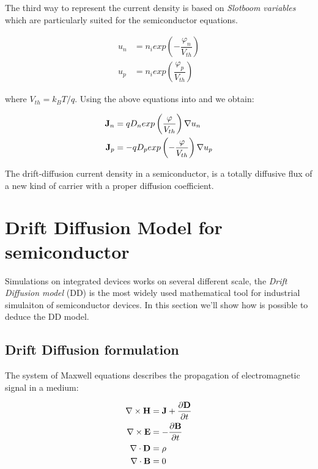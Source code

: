 The third way to represent the current density is based on \textit{Slotboom variables} which are particularly suited for the semiconductor equations.

\begin{align}
u_n &= n_iexp\left(-\dfrac{\varphi_n}{V_{th}} \right) \label{eq: un slotboom} \\
u_p &= n_iexp\left(\dfrac{\varphi_p}{V_{th}} \right) \label{eq: up slotboom} 
\end{align}

where $V_{th}=k_BT/q$. Using the above equations into  and  we obtain:

\begin{align}
\mathbf{J}_n &= qD_n exp\left(\dfrac{\varphi}{V_{th}}\right) \nabla u_n \label{eq: Jn slotboom} \\
\mathbf{J}_p &= -qD_p exp\left(-\dfrac{\varphi}{V_{th}}\right)  \nabla u_p \label{eq: Jp slotboom}
\end{align}

\begin{Osservazione}
The drift-diffusion current density in a semiconductor, is a totally diffusive flux of a new kind of carrier with a proper diffusion coefficient. 
\end{Osservazione}


\section{Drift Diffusion Model for semiconductor}
\label{section: dd model for semi}

Simulations on integrated devices works on several different scale, the \textit{Drift Diffusion model} (DD) is the most widely used mathematical tool for industrial simulaiton of semiconductor devices. In this section we'll show how is possible to deduce the DD model.

\subsection{Drift Diffusion formulation}
 The system of Maxwell equations describes the propagation of electromagnetic signal in a medium:

\begin{align}
\nabla \times \mathbf{H} & =  \mathbf{J} + \dfrac{\partial \mathbf{D}}{\partial t} \label{eq: magnetic equation} \\ 
\nabla \times \mathbf{E} & =  - \dfrac{\partial \mathbf{B}}{\partial t} \label{eq: ampere law}\\ 
\nabla \cdot \mathbf{D} & =  \rho \label{eq: gauss law}\\ 
\nabla \cdot \mathbf{B} &  =  0 \label{eq: no magetic charge law}
\end{align}

